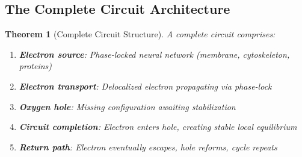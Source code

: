 \documentclass[12pt,a4paper]{article}
\newtheorem{theorem}{Theorem}
\begin{document}
\subsection{The Complete Circuit Architecture}

\begin{theorem}[Complete Circuit Structure]
\label{thm:complete_circuit}
A complete circuit comprises:
\begin{enumerate}
\item \textbf{Electron source}: Phase-locked neural network (membrane, cytoskeleton, proteins)
\item \textbf{Electron transport}: Delocalized electron propagating via phase-lock
\item \textbf{Oxygen hole}: Missing  configuration awaiting stabilization
\item \textbf{Circuit completion}: Electron enters hole, creating stable local equilibrium
\item \textbf{Return path}: Electron eventually escapes, hole reforms, cycle repeats
\end{enumerate}
\end{theorem}
\end{document}
